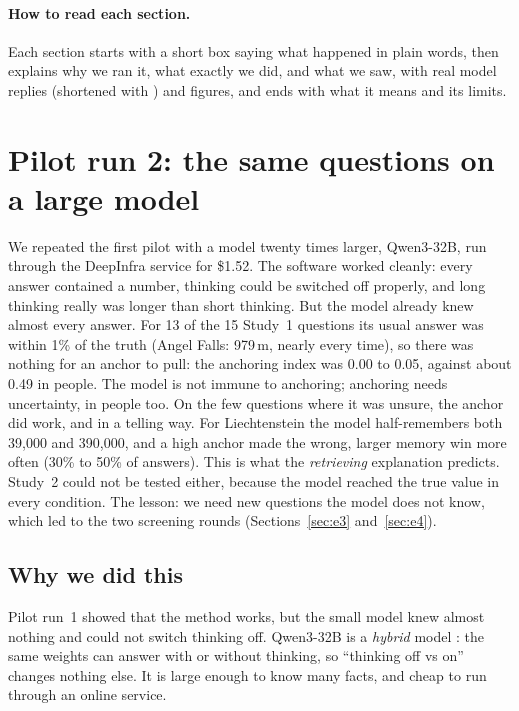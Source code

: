 \documentclass[11pt,a4paper]{article}
\begin{document}
\paragraph{How to read each section.} Each section starts with a short box saying what happened in plain words, then explains why we ran it, what exactly we did, and what we saw, with real model replies (shortened with \cut) and figures, and ends with what it means and its limits.

\section{Pilot run 2: the same questions on a large model}
\label{sec:e2}

\begin{inshort}
We repeated the first pilot with a model twenty times larger, Qwen3-32B, run through the DeepInfra service for \$1.52. The software worked cleanly: every answer contained a number, thinking could be switched off properly, and long thinking really was longer than short thinking. But the model already knew almost every answer. For 13 of the 15 Study~1 questions its usual answer was within 1\% of the truth (Angel Falls: 979\,m, nearly every time), so there was nothing for an anchor to pull: the anchoring index was 0.00 to 0.05, against about 0.49 in people. The model is not immune to anchoring; anchoring needs uncertainty, in people too. On the few questions where it was unsure, the anchor did work, and in a telling way. For Liechtenstein the model half-remembers both 39,000 and 390,000, and a high anchor made the wrong, larger memory win more often (30\% to 50\% of answers). This is what the \emph{retrieving} explanation predicts. Study~2 could not be tested either, because the model reached the true value in every condition. The lesson: we need new questions the model does not know, which led to the two screening rounds (Sections~\ref{sec:e3} and~\ref{sec:e4}).
\end{inshort}

\subsection{Why we did this}
Pilot run~1 showed that the method works, but the small model knew almost nothing and could not switch thinking off. Qwen3-32B is a \emph{hybrid} model \citep{yang2025qwen3}: the same weights can answer with or without thinking, so \enquote{thinking off vs on} changes nothing else. It is large enough to know many facts, and cheap to run through an online service.
\end{document}
